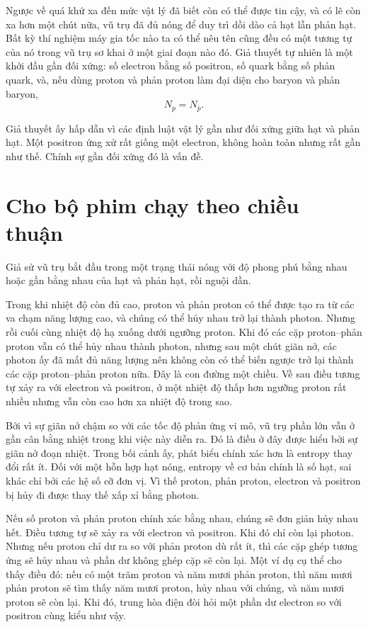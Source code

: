 Ngược về quá khứ xa đến mức vật lý đã biết còn có thể được tin cậy, và có lẽ còn xa hơn một chút nữa, vũ trụ đã đủ nóng để duy trì dồi dào cả hạt lẫn phản hạt. Bất kỳ thí nghiệm máy gia tốc nào ta có thể nêu tên cũng đều có một tương tự của nó trong vũ trụ sơ khai ở một giai đoạn nào đó. Giả thuyết tự nhiên là một khởi đầu gần đối xứng: số electron bằng số positron, số quark bằng số phản quark, và, nếu dùng proton và phản proton làm đại diện cho baryon và phản baryon,
\[
N_p = N_{\bar p}.
\]

Giả thuyết ấy hấp dẫn vì các định luật vật lý gần như đối xứng giữa hạt và phản hạt. Một positron ứng xử rất giống một electron, không hoàn toàn nhưng rất gần như thế. Chính sự gần đối xứng đó là vấn đề.

\section{Cho bộ phim chạy theo chiều thuận}

Giả sử vũ trụ bắt đầu trong một trạng thái nóng với độ phong phú bằng nhau hoặc gần bằng nhau của hạt và phản hạt, rồi nguội dần.

Trong khi nhiệt độ còn đủ cao, proton và phản proton có thể được tạo ra từ các va chạm năng lượng cao, và chúng có thể hủy nhau trở lại thành photon. Nhưng rồi cuối cùng nhiệt độ hạ xuống dưới ngưỡng proton. Khi đó các cặp proton--phản proton vẫn có thể hủy nhau thành photon, nhưng sau một chút giãn nở, các photon ấy đã mất đủ năng lượng nên không còn có thể biến ngược trở lại thành các cặp proton--phản proton nữa. Đây là con đường một chiều. Về sau điều tương tự xảy ra với electron và positron, ở một nhiệt độ thấp hơn ngưỡng proton rất nhiều nhưng vẫn còn cao hơn xa nhiệt độ trong sao.

Bởi vì sự giãn nở chậm so với các tốc độ phản ứng vi mô, vũ trụ phần lớn vẫn ở gần cân bằng nhiệt trong khi việc này diễn ra. Đó là điều ở đây được hiểu bởi sự giãn nở đoạn nhiệt. Trong bối cảnh ấy, phát biểu chính xác hơn là entropy thay đổi rất ít. Đối với một hỗn hợp hạt nóng, entropy về cơ bản chính là số hạt, sai khác chỉ bởi các hệ số cỡ đơn vị. Vì thế proton, phản proton, electron và positron bị hủy đi được thay thế xấp xỉ bằng photon.

Nếu số proton và phản proton chính xác bằng nhau, chúng sẽ đơn giản hủy nhau hết. Điều tương tự sẽ xảy ra với electron và positron. Khi đó chỉ còn lại photon. Nhưng nếu proton chỉ dư ra so với phản proton dù rất ít, thì các cặp ghép tương ứng sẽ hủy nhau và phần dư không ghép cặp sẽ còn lại. Một ví dụ cụ thể cho thấy điều đó: nếu có một trăm proton và năm mươi phản proton, thì năm mươi phản proton sẽ tìm thấy năm mươi proton, hủy nhau với chúng, và năm mươi proton sẽ còn lại. Khi đó, trung hòa điện đòi hỏi một phần dư electron so với positron cùng kiểu như vậy.

